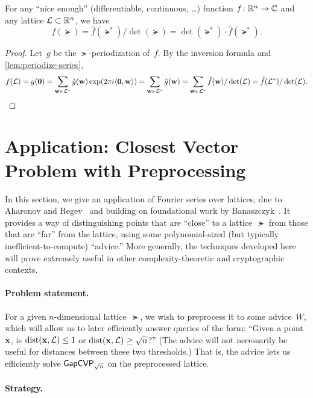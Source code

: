 \documentclass[11pt]{article}
\begin{document}
\begin{lemma}
  \label{lem:psf}
  For any ``nice enough'' (differentiable, continuous, \ldots)
  function $f \colon \mathbb{R}^n \to \mathbb{C}$ and any lattice
  $\mathcal{L} \subset \mathbb{R}^{n}$, we have
  \[ f(\lat) = \hat{f}(\lat^{*}) / \det(\lat) = \det(\lat^*) \cdot
    \hat{f}(\lat^*). \]
\end{lemma}

\begin{proof}
  Let~$g$ be the $\lat$-periodization of~$f$. By the inversion formula
  and \cref{lem:periodize-series},
  \[ f(\mathcal{L}) = g(\mathbf{0}) = \sum_{\mathbf{w} \in \mathcal{L}^*}
    \hat{g}(\mathbf{w})\exp(2 \pi i \langle\mathbf{0},\mathbf{w}\rangle) = \sum_{\mathbf{w}
      \in \mathcal{L}^*} \hat{g}(\mathbf{w}) = \sum_{\mathbf{w} \in \mathcal{L}^{*}}
    \hat{f}(\mathbf{w})/\det(\mathcal{L}) = \hat{f}(\mathcal{L}^{*}) / \det(\mathcal{L}). \]
\end{proof}

\section{Application: Closest Vector Problem with Preprocessing}

In this section, we give an application of Fourier series over
lattices, due to Aharonov and
Regev~\cite{DBLP:journals/jacm/AharonovR05} and building on
foundational work by Banaszczyk~\cite{banaszczyk93:_new}. It provides
a way of distinguishing points that are ``close'' to a lattice~$\lat$
from those that are ``far'' from the lattice, using some
polynomial-sized (but typically inefficient-to-compute) ``advice.''
More generally, the techniques developed here will prove extremely
useful in other complexity-theoretic and cryptographic contexts.

\paragraph{Problem statement.}

For a given $n$-dimensional lattice~$\lat$, we wish to preprocess it
to some advice~$W$, which will allow us to later efficiently answer
queries of the form: ``Given a point $\mathbf{x}$, is
$\operatorname{dist}(\mathbf{x},\mathcal{L}) \leq 1$ or $\operatorname{dist}(\mathbf{x},\mathcal{L}) \geq \sqrt{n}$?''
(The advice will not necessarily be useful for distances between these
two thresholds.) That is, the advice lets us efficiently solve
$\mathsf{GapCVP}_{\sqrt{n}}$ on the preprocessed lattice.

\paragraph{Strategy.}
\end{document}

